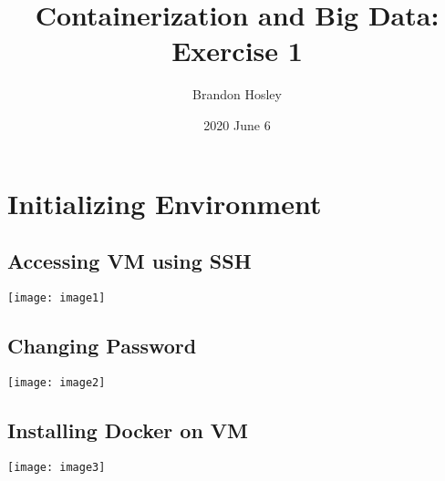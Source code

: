 \documentclass[]{article}
\title{Containerization and Big Data: Exercise 1}
\author{Brandon Hosley}
\date{2020 June 6}
\begin{document}
\maketitle

\section{Initializing Environment}
\subsection{Accessing VM using SSH}
	\texttt{[image: image1]}
\subsection{Changing Password}
	\texttt{[image: image2]}
\subsection{Installing Docker on VM}
	\texttt{[image: image3]}
\end{document}
